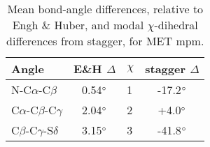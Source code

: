 \bigskip


\begin{table}[h]
\vspace{-10pt}
\begin{tabular}{lc|lc} \\ \toprule
Angle     & E\&H $\Delta$ & $\chi$ & stagger $\Delta$ \\ \bottomrule
N-C$\alpha$-C$\beta$  & 0.54$\degree$ & 1 & -17.2$\degree$\\
C$\alpha$-C$\beta$-C$\gamma$  & 2.04$\degree$ & 2 & +4.0$\degree$\\
C$\beta$-C$\gamma$-S$\delta$ & 3.15$\degree$ & 3 & -41.8$\degree$\\ \bottomrule
\end{tabular}
\caption{Mean bond-angle differences, relative to Engh \& Huber, and modal $\chi$-dihedral differences from stagger, for MET mpm.}
\label{tab:metmpmangles}
\vspace{-10pt}
\end{table}
